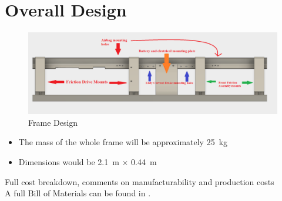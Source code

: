 \documentclass[main.tex]{subfiles}
\begin{document}
    \section{Overall Design}
    \begin{figure}
        \centering
        \includegraphics[width=\linewidth]{images/fig24}
        \caption{Frame Design}
        \label{fig:frame-design}
    \end{figure}
    \begin{itemize}
        \item The mass of the whole frame will be approximately \SI{25}{kg}
        \item Dimensions would be \SI{2.1}{m} $\times$ \SI{0.44}{m}
    \end{itemize}
    Full cost breakdown, comments on manufacturability and production costs\\
    A full Bill of Materials can be found in .\\
\end{document}
